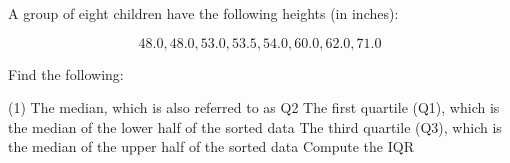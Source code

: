 \documentclass[../mathNotesPreamble]{subfiles}
\begin{document}
  \begin{ex*}
    A group of eight children have the following heights (in inches):

    \noindent
    \begin{minipage}{0.4\linewidth}
      \[48.0, 48.0, 53.0, 53.5, 54.0, 60.0, 62.0, 71.0\]
    \end{minipage}
    \begin{minipage}{0.575\linewidth}
      \centering
    \end{minipage}
    \vspace*{\baselineskip}

    \noindent
    Find the following:
    \begin{tasks}[after-item-skip=\stretch{1}, label=\textbullet](1)
      \task The median, which is also referred to as Q2
      \task The first quartile (Q1), which is the median of the lower half of the sorted data
      \task The third quartile (Q3), which is the median of the upper half of the sorted data
      \task Compute the IQR
    \end{tasks}
  \end{ex*}

  \pagebreak
\end{document}
